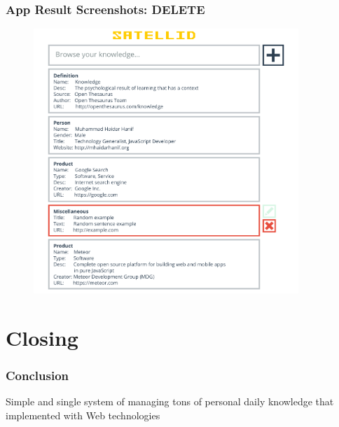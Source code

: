 \documentclass[10pt, compress]{beamer}
\begin{document}

\begin{frame}[fragile]
  \frametitle{App Result Screenshots: DELETE}

  \begin{figure}[ht]
    \centering
    \vspace{-1cm}
    \includegraphics[height=10cm]{include/satellid-app-results_delete.png}
    \vspace{-10pt}
    \label{fig:satellid-app-results_delete}
  \end{figure}

\end{frame}


\section{Closing}


\begin{frame}[fragile]
  \frametitle{Conclusion}

  Simple and single \alert{system} of managing tons of \alert{personal daily knowledge}
  that implemented with \alert{Web technologies}

\end{frame}

\end{document}
